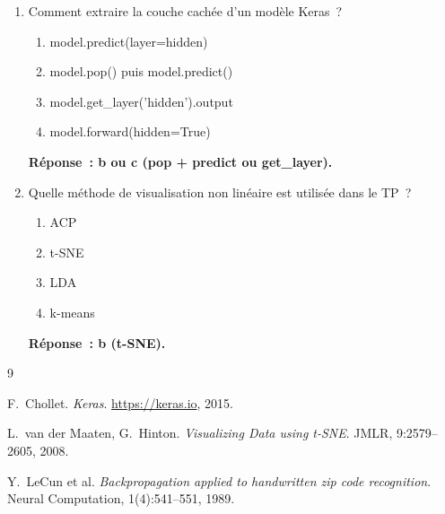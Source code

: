 \documentclass[a4paper,11pt]{article}
\theoremstyle{definition}
\theoremstyle{remark}
\begin{document}
\begin{enumerate}
  \item Comment extraire la couche cach\'ee d'un mod\`ele Keras~?
    \begin{enumerate}
      \item model.predict(layer=hidden)
      \item model.pop() puis model.predict()
      \item model.get\_layer('hidden').output
      \item model.forward(hidden=True)
    \end{enumerate}
    \textbf{R\'eponse~: b ou c (pop + predict ou get\_layer).}

  \item Quelle m\'ethode de visualisation non lin\'eaire est
    utilis\'ee dans le TP~?
    \begin{enumerate}
      \item ACP
      \item t-SNE
      \item LDA
      \item k-means
    \end{enumerate}
    \textbf{R\'eponse~: b (t-SNE).}

\end{enumerate}

\begin{thebibliography}{9}

  F.~Chollet.
  \newblock \emph{Keras}. \url{https://keras.io}, 2015.

  L.~van der Maaten, G.~Hinton.
  \newblock \emph{Visualizing Data using t-SNE}.
  \newblock JMLR, 9:2579--2605, 2008.

  Y.~LeCun et al.
  \newblock \emph{Backpropagation applied to handwritten zip code
    recognition}.
  \newblock Neural Computation, 1(4):541--551, 1989.

\end{thebibliography}
\end{document}
